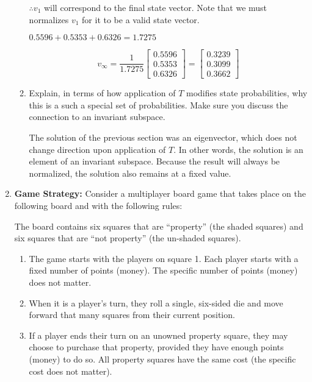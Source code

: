 \documentclass[fleqn]{article}
\begin{document}
\begin{enumerate}[nolistsep]
\begin{enumerate}
			$\therefore v_1$ will correspond to the final state vector. Note that we must normalizes $v_1$ for it to be a valid state vector.
			
			$0.5596 + 0.5353 + 0.6326 = 1.7275$
			
			\begin{equation*}
				v_{\infty} = \frac{1}{1.7275}\begin{bmatrix}
					0.5596 \\
					0.5353 \\
					0.6326
				\end{bmatrix} = \begin{bmatrix}
					0.3239 \\
					0.3099 \\
					0.3662
				\end{bmatrix}
			\end{equation*}
			
			\item Explain, in terms of how application of $T$ modifies state probabilities, why this is a such a special set of probabilities. Make sure you discuss the connection to an invariant subspace.
			
			The solution of the previous section was an eigenvector, which does not change direction upon application of $T$. In other words, the solution is an element of an invariant subspace. Because the result will always be normalized, the solution also remains at a fixed value.
		\end{enumerate}
		
		\item \textbf{Game Strategy:} Consider a multiplayer board game that takes place on the following board and with the following rules:
		
		The board contains six squares that are “property” (the shaded squares) and six squares that are “not property” (the un-shaded squares).
		
		\begin{enumerate}
			\item The game starts with the players on square 1. Each player starts with a fixed number of points (money). The specific number of points (money) does not matter.
			
			\item When it is a player’s turn, they roll a single, six-sided die and move forward that many squares from their current position.

			\item If a player ends their turn on an unowned property square, they may choose to purchase that property, provided they have enough points (money) to do so. All property squares have the same cost (the specific cost does not matter).


\end{enumerate}
\end{enumerate}
\end{document}
